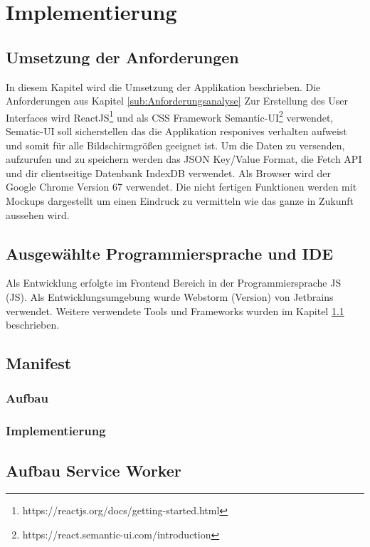 \chapter{Implementierung}\label{chap:Implementierung}
\thispagestyle{standard}
\pagestyle{standard}

\section{Umsetzung der Anforderungen}\label{sub:Umsetzung der Anforderungen}
In diesem Kapitel wird die Umsetzung der Applikation beschrieben. Die Anforderungen aus Kapitel \ref{sub:Anforderungsanalyse}
Zur Erstellung des User Interfaces wird ReactJS\footnote{https://reactjs.org/docs/getting-started.html} und als CSS Framework Semantic-UI\footnote{https://react.semantic-ui.com/introduction} verwendet, Sematic-UI soll sicherstellen das die Applikation responives verhalten aufweist und somit für alle Bildschirmgrößen geeignet ist. Um die Daten zu versenden, aufzurufen und zu speichern werden das JSON Key/Value Format, die Fetch API und dir clientseitige Datenbank IndexDB verwendet.
Als Browser wird der Google Chrome Version 67 verwendet.
Die nicht fertigen Funktionen werden mit Mockups dargestellt um einen Eindruck zu vermitteln wie das ganze in Zukunft aussehen wird.

\section{Ausgewählte Programmiersprache und IDE}
Als Entwicklung erfolgte im Frontend Bereich in der Programmiersprache \acl{JS} (\acs{JS}). Als
Entwicklungsumgebung wurde Webstorm (Version) von Jetbrains verwendet. Weitere verwendete Tools und Frameworks wurden im Kapitel \ref{sub:Umsetzung der Anforderungen} beschrieben.


\section{Manifest}
\subsection{Aufbau}
\subsection{Implementierung}



\section{Aufbau Service Worker}

